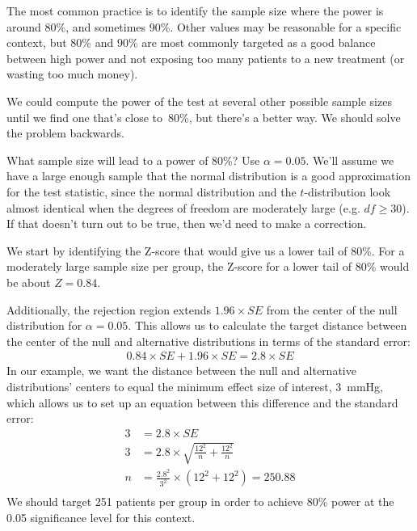 The most common practice is to identify the sample size where
the power is around 80\%, and sometimes 90\%.
Other values may be reasonable for a specific context,
but 80\% and 90\% are most commonly targeted as a good
balance between high power and not exposing too many
patients to a new treatment (or wasting too much money).

We could compute the power of the test at several other
possible sample sizes until we find one that's close to~80\%,
but there's a better way.
We should solve the problem backwards.

\begin{examplewrap}
\begin{nexample}{What sample size will lead to a power of 80\%? Use $\alpha = 0.05$.}
  \label{sample_size_for_80_percent_power}%
  We'll assume we have a large enough sample that the normal
  distribution is a good approximation for the test statistic,
  since the normal distribution and the $t$-distribution
  look almost identical when the degrees of freedom are
  moderately large (e.g. $df \geq 30$).
  If that doesn't turn out to be true, then we'd need to make
  a correction.

  We start by identifying the Z-score that would give us a lower
  tail of 80\%.
  For a moderately large sample size per group,
  the Z-score for a lower tail of 80\% would be about $Z = 0.84$.
  \begin{center}
  \end{center}
  Additionally, the rejection region extends
  $1.96\times SE$ from the center of the null distribution
  for $\alpha = 0.05$.
  This allows us to calculate the target distance between
  the center of the null and alternative distributions in
  terms of the standard error:
  \begin{align*}
  0.84 \times SE + 1.96 \times SE = 2.8 \times SE
  \end{align*}
  In our example, we want the distance between the null
  and alternative distributions' centers to equal the minimum
  effect size of interest, 3~mmHg, which allows us to set up
  an equation between this difference and the standard error:
  \begin{align*}
  3 &= 2.8 \times SE \\
  3 &= 2.8 \times \sqrt{\frac{12^2}{n} + \frac{12^2}{n}} \\
  n &= \frac{2.8^2}{3^2} \times \left( 12^2 + 12^2 \right)
    = 250.88 \\
  \end{align*}
  We should target 251 patients per group in order to achieve
  80\% power at the 0.05 significance level for this context.
\end{nexample}
\end{examplewrap}

